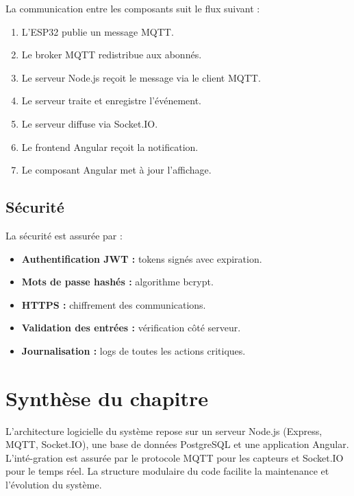 La communication entre les composants suit le flux suivant :

\begin{enumerate}
    \item L'ESP32 publie un message MQTT.
    \item Le broker MQTT redistribue aux abonn\'es.
    \item Le serveur Node.js re\c{c}oit le message via le client MQTT.
    \item Le serveur traite et enregistre l'\'ev\'enement.
    \item Le serveur diffuse via Socket.IO.
    \item Le frontend Angular re\c{c}oit la notification.
    \item Le composant Angular met \`a jour l'affichage.
\end{enumerate}

\subsection{S\'ecurit\'e}

La s\'ecurit\'e est assur\'ee par :

\begin{itemize}
    \item \textbf{Authentification JWT :} tokens sign\'es avec expiration.
    \item \textbf{Mots de passe hash\'es :} algorithme bcrypt.
    \item \textbf{HTTPS :} chiffrement des communications.
    \item \textbf{Validation des entr\'ees :} v\'erification c\^ot\'e serveur.
    \item \textbf{Journalisation :} logs de toutes les actions critiques.
\end{itemize}

\section{Synth\`ese du chapitre}

L'architecture logicielle du syst\`eme repose sur un serveur Node.js (Express, MQTT, Socket.IO), une base de donn\'ees PostgreSQL et une application Angular. L'int\'e-gration est assur\'ee par le protocole MQTT pour les capteurs et Socket.IO pour le temps r\'eel. La structure modulaire du code facilite la maintenance et l'\'evolution du syst\`eme.
